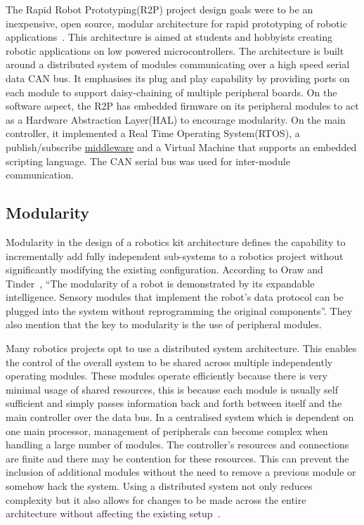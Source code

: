 The Rapid Robot Prototyping(R2P) project design goals were to be an inexpensive, open source, modular architecture for rapid prototyping of robotic applications~\parencite{r2p}. This architecture is aimed at students and hobbyists creating robotic applications on low powered microcontrollers. The architecture is built around a distributed system of modules communicating over a high speed serial data CAN bus. It emphasises its plug and play capability by providing ports on each module to support daisy-chaining of multiple peripheral boards. On the software aspect, the R2P has embedded firmware on its peripheral modules to act as a Hardware Abstraction Layer(HAL) to encourage modularity. On the main controller, it implemented a Real Time Operating System(RTOS), a publish/subscribe \hyperref[ssub:middleware]{middleware} and a Virtual Machine that supports an embedded scripting language. The CAN serial bus was used for inter-module communication. 
%
%



\subsection{Modularity} %
\label{sub:modularity}
Modularity in the design of a robotics kit architecture defines the capability to incrementally add fully independent sub-systems to a robotics project without significantly modifying the existing configuration. According to Oraw and Tinder~\parencite{mars}, ``The modularity of a robot is demonstrated by its expandable intelligence. Sensory modules that implement the robot's data protocol can be plugged into the system without reprogramming the original components''. They also mention that the key to modularity is the use of peripheral modules. 

Many robotics projects opt to use a distributed system architecture. This enables the control of the overall system to be shared across multiple independently operating modules. These modules operate efficiently because there is very minimal usage of shared resources, this is because each module is usually self sufficient and simply passes information back and forth between itself and the main controller over the data bus. In a centralised system which is dependent on one main processor, management of peripherals can become complex when handling a large number of modules. The controller's resources and connections are finite and there may be contention for these resources. This can prevent the inclusion of additional modules without the need to remove a previous module or somehow hack the system.  Using a distributed system not only reduces complexity but it also allows for changes to be made across the entire architecture without affecting the existing setup~\parencite{avcithesis}.

